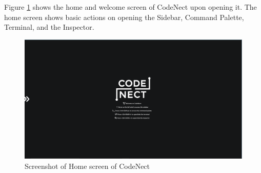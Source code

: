 \parx
Figure \ref{fig:cn_home} shows the home and welcome screen of CodeNect upon opening it.
The home screen shows basic actions on opening the Sidebar, Command Palette, Terminal,
and the Inspector.

\begin{figure}[H]
	\centering
	\captionsetup{justification=centering}
	\captionsetup[figure]{list=yes}
	\includegraphics[width=\linewidth]{media/sc_home.png}
	\caption[Screenshot of Home Screen of CodeNect]{Screenshot of Home screen of CodeNect}
	\label{fig:cn_home}
\end{figure}
